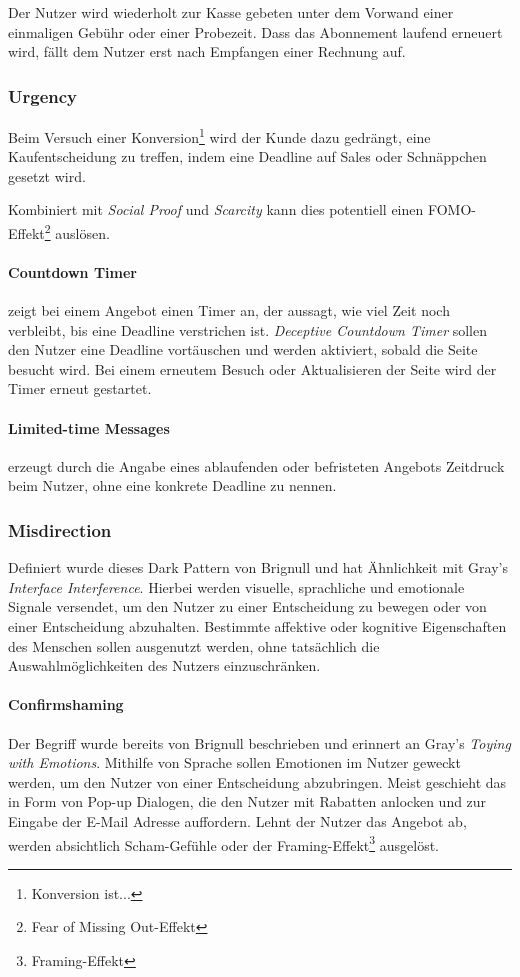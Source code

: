 \documentclass[a4paper]{article}
\newcommand{\todo}[1]{{\color{purple}{#1}}}
\begin{document}
Der Nutzer wird wiederholt zur Kasse gebeten unter dem Vorwand einer einmaligen Gebühr oder einer Probezeit. Dass das Abonnement laufend erneuert wird, fällt dem Nutzer erst nach Empfangen einer Rechnung auf.  

\subsubsection{Urgency}

Beim Versuch einer Konversion\todo{Konversion definieren}\footnote{\label{foot:3} Konversion ist...} wird der Kunde dazu gedrängt, eine Kaufentscheidung zu treffen, indem eine Deadline auf Sales oder Schnäppchen gesetzt wird. 

Kombiniert mit \textit{Social Proof} und \textit{Scarcity} kann dies potentiell einen FOMO-Effekt\footnote{\label{foot:4} Fear of Missing Out-Effekt} auslösen.

\paragraph{Countdown Timer} zeigt bei einem Angebot einen Timer an, der aussagt, wie viel Zeit noch verbleibt, bis eine Deadline verstrichen ist. \textit{Deceptive Countdown Timer} sollen den Nutzer eine Deadline vortäuschen und werden aktiviert, sobald die Seite besucht wird. Bei einem erneutem Besuch oder Aktualisieren der Seite wird der Timer erneut gestartet.

\paragraph{Limited-time Messages} erzeugt durch die Angabe eines ablaufenden oder befristeten Angebots Zeitdruck beim Nutzer, ohne eine konkrete Deadline zu nennen.

\subsubsection{Misdirection}
Definiert wurde dieses Dark Pattern von Brignull und hat Ähnlichkeit mit Gray's \textit{Interface Interference}.
Hierbei werden visuelle, sprachliche und emotionale Signale versendet, um den Nutzer zu einer Entscheidung zu bewegen oder von einer Entscheidung abzuhalten. Bestimmte affektive oder kognitive Eigenschaften des Menschen sollen ausgenutzt werden, ohne tatsächlich die Auswahlmöglichkeiten des Nutzers einzuschränken.

\paragraph{Confirmshaming}
Der Begriff wurde bereits von Brignull beschrieben und erinnert an Gray's \textit{Toying with Emotions}. 
Mithilfe von Sprache sollen Emotionen im Nutzer geweckt werden, um den Nutzer von einer Entscheidung abzubringen. Meist geschieht das in Form von Pop-up Dialogen, die den Nutzer mit Rabatten anlocken und zur Eingabe der E-Mail Adresse auffordern. Lehnt der Nutzer das Angebot ab, werden absichtlich Scham-Gefühle oder der Framing-Effekt\footnote{\label{foot:5} Framing-Effekt} ausgelöst.
\end{document}
